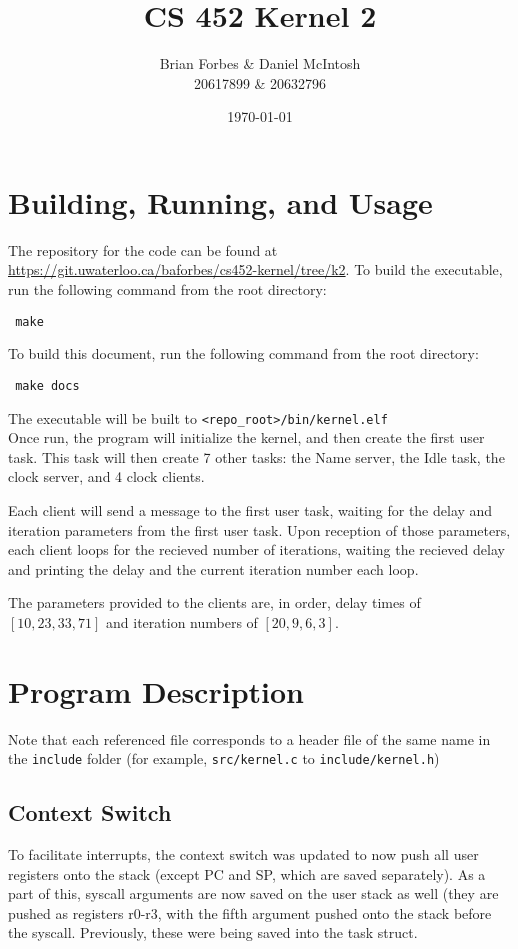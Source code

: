 \documentclass{article}
\begin{document}
\title{CS 452 Kernel 2}
\author{Brian Forbes \& Daniel McIntosh \\ 20617899 \& 20632796}
\date{\today}

\maketitle

\section{Building, Running, and Usage}

The repository for the code can be found at \url{https://git.uwaterloo.ca/baforbes/cs452-kernel/tree/k2}.
To build the executable, run the following command from the root directory: \begin{verbatim} make \end{verbatim}
To build this document, run the following command from the root directory: \begin{verbatim} make docs \end{verbatim}
The executable will be built to \verb|<repo_root>/bin/kernel.elf|\\

Once run, the program will initialize the kernel, and then create the first user task. This task will then create 7 other tasks: the Name server, the Idle task, the clock server, and 4 clock clients.

Each client will send a message to the first user task, waiting for the delay and iteration parameters from the first user task. 
Upon reception of those parameters, each client loops for the recieved number of iterations, waiting the recieved delay and printing the delay and the current iteration number each loop.

The parameters provided to the clients are, in order, delay times of $[10, 23, 33, 71]$ and iteration numbers of $[20, 9, 6, 3]$.

\section{Program Description}
Note that each referenced file corresponds to a header file of the same name in the \verb|include| folder (for example, \verb|src/kernel.c| to \verb|include/kernel.h|)
\subsection{Context Switch}
    To facilitate interrupts, the context switch was updated to now push all user registers onto the stack (except PC and SP, which are saved separately). As a part of this, syscall arguments are now saved on the user stack as well (they are pushed as registers r0-r3, with the fifth argument pushed onto the stack before the syscall. Previously, these were being saved into the task struct.
\end{document}
